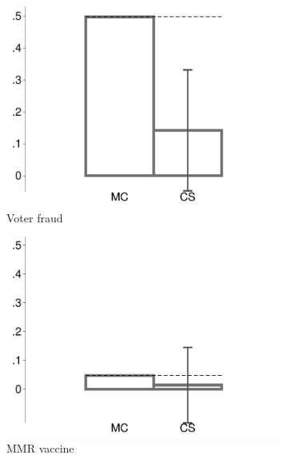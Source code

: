 \begin{figure}[t]
\begin{subfigure}{.325\textwidth}
		\includegraphics[width=\textwidth]{../figs/confidence_score_ccd_cud_rw_fraud_study1.pdf}
		\caption{Voter fraud}
	\end{subfigure}
	\hfill
	\begin{subfigure}{.325\textwidth}\centering
		\includegraphics[width=\textwidth]{../figs/confidence_score_ccd_cud_rw_mmr_study1.pdf}
		\caption{MMR vaccine}
	\end{subfigure}	
	\hfill
	\begin{subfigure}{.325\textwidth}\centering

\end{subfigure}
\end{figure}
